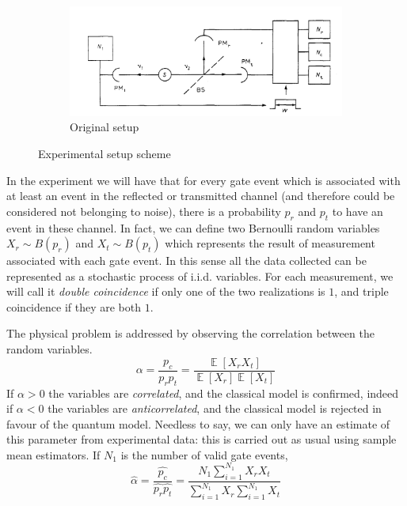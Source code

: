 \documentclass[10pt, final]{article}
\DeclareMathOperator{\E}{\mathbb{E}}
\begin{document}
\begin{multicols}{2}
\begin{mdframed}
\begin{figure}[H]
        \begin{subfigure}{\textwidth}
            \centering
            \includegraphics[width = \textwidth]{../images/original.png}
            \caption{Original setup}
        \end{subfigure}
        \caption{Experimental setup scheme}
    \end{figure}
\end{mdframed}
In the experiment we will have that for every gate event which is associated with at least an event in the reflected or transmitted channel (and therefore could be considered not belonging to noise), there is a probability $p_r$ and $p_t$ to have an event in these channel. In fact, we can define two Bernoulli random variables $X_r \sim B(p_r)$ and $X_t \sim B(p_t)$ which represents the result of measurement associated with each gate event. In this sense all the data collected can be represented as a stochastic process of i.i.d. variables. For each measurement, we will call it \emph{double coincidence} if only one of the two realizations is $1$, and triple coincidence if they are both $1$. 

The physical problem is addressed by observing the correlation between the random variables. 
\begin{equation}
    \alpha = \frac{p_c}{p_r p_t} = \frac{\E[X_r X_t]}{\E[X_r]\E[X_t]}
\end{equation}
If $\alpha > 0$ the variables are \emph{correlated}, and the classical model is confirmed, indeed if $\alpha < 0$ the variables are \emph{anticorrelated}, and the classical model is rejected in favour of the quantum model.
Needless to say, we can only have an estimate of this parameter from experimental data: this is carried out as usual using sample mean estimators. If $N_1$ is the number of valid gate events,
\begin{equation}
    \widehat{\alpha} = \frac{\widehat{p_c}}{\widehat{p_r} \widehat{p_t}} = \frac{N_1 \sum_{i=1}^{N_1} X_r X_t}{\sum_{i=1}^{N_1} X_r\sum_{i=1}^{N_1} X_t}
\end{equation}

\end{multicols}
\end{document}
